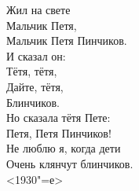 Жил на свете\\
               Мальчик Петя,\\ 
               Мальчик Петя Пинчиков.\\ 
               И сказал он:\\ 
               Тётя, тётя,\\ 
               Дайте, тётя,\\
               Блинчиков.\\ 

               Но сказала тётя Пете:\\ 
               Петя, Петя Пинчиков!\\ 
               Не люблю я, когда дети\\ 
               Очень клянчут блинчиков.\\ 

               <1930"=е> 
